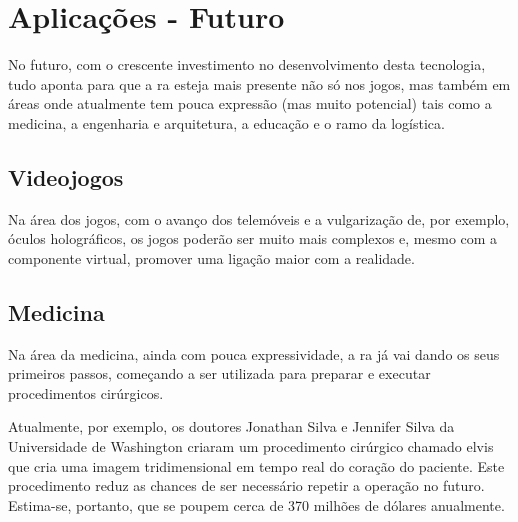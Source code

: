 \documentclass{report}
\begin{document}
\section{Aplicações - Futuro}
No futuro, com o crescente investimento no desenvolvimento desta tecnologia, tudo aponta para que a \ac{ra} esteja mais presente não só nos jogos, mas também em áreas onde atualmente tem pouca expressão (mas muito potencial) tais como a medicina, a engenharia e arquitetura, a educação e o ramo da logística. 

\subsection{Videojogos}
Na área dos jogos, com o avanço dos telemóveis e a vulgarização de, por exemplo, óculos holográficos, os jogos poderão ser muito mais complexos e, mesmo com a componente virtual, promover uma ligação maior com a realidade.

\subsection{Medicina}
Na área da medicina, ainda com pouca expressividade, a \ac{ra} já vai dando os seus primeiros passos, começando a ser utilizada para preparar e executar procedimentos cirúrgicos.

Atualmente, por exemplo, os doutores Jonathan Silva e Jennifer Silva da Universidade de Washington criaram um procedimento cirúrgico chamado \ac{elvis} que cria uma imagem tridimensional em tempo real do coração do paciente. Este procedimento reduz as chances de ser necessário repetir a operação no futuro. Estima-se, portanto, que se poupem cerca de 370 milhões de dólares anualmente.\cite{staff_2021}
\end{document}
